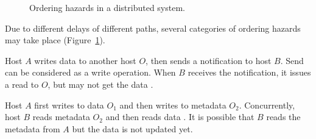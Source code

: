 \begin{figure}[t]
\centering
    \hspace{0.02\textwidth}
	\caption{Ordering hazards in a distributed system.}
	\label{fig:ordering}
\end{figure}


 Due to different delays of different paths, several categories of ordering hazards~\cite{gharachorloo1990memory,sewell2010x86} may take place (Figure~\ref{fig:ordering}).

Host $A$ writes data to another host $O$, then sends a notification to host $B$. Send can be considered as a write operation.
When $B$ receives the notification, it issues a read to $O$, but may not get the data .

Host $A$ first writes to data $O_1$ and then writes to metadata $O_2$. Concurrently, host $B$ reads metadata $O_2$ and then reads data .
It is possible that $B$ reads the metadata from $A$ but the data is not updated yet.

